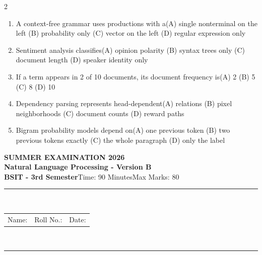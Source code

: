 \documentclass[a4paper]{article}
\makeatletter
\newcommand{\examheader}{%
\begin{center}\textbf{\large SUMMER EXAMINATION 2026}\\[-1pt]
\textbf{\normalsize Natural Language Processing - Version B}\\[-1pt]
\textbf{BSIT - 3rd Semester}\quad Time: 90 Minutes\quad Max Marks: 80\\[-1pt]
\textcolor{black!65}{\rule{\linewidth}{0.45pt}}\\[-2pt]
\begin{tabularx}{\linewidth}{@{}X X X@{}}Name: \hrulefill & Roll No.: \hrulefill & Date: \hrulefill\end{tabularx}\\[-1pt]
\textcolor{black!65}{\rule{\linewidth}{0.45pt}}\end{center}}
\makeatother
\begin{document}
\begin{multicols*}{2}
\begin{enumerate}
\item A context-free grammar uses productions with a\newline\hspace*{0.6em}(A) single nonterminal on the left \quad (B) probability only \newline\hspace*{0.6em}(C) vector on the left \quad (D) regular expression only
\item Sentiment analysis classifies\newline\hspace*{0.6em}(A) opinion polarity \quad (B) syntax trees only \newline\hspace*{0.6em}(C) document length \quad (D) speaker identity only
\item If a term appears in 2 of 10 documents, its document frequency is\newline\hspace*{0.6em}(A) 2 \quad (B) 5 \newline\hspace*{0.6em}(C) 8 \quad (D) 10
\item Dependency parsing represents head-dependent\newline\hspace*{0.6em}(A) relations \quad (B) pixel neighborhoods \newline\hspace*{0.6em}(C) document counts \quad (D) reward paths
\item Bigram probability models depend on\newline\hspace*{0.6em}(A) one previous token \quad (B) two previous tokens exactly \newline\hspace*{0.6em}(C) the whole paragraph \quad (D) only the label
\end{enumerate}
\end{multicols*}
\newpage
\examheader
\raggedcolumns
\end{document}

